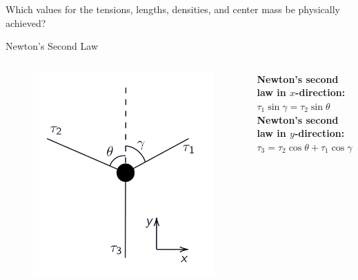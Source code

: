 \documentclass{beamer}
\begin{document}
\begin{frame}
    \centering
    \Huge Which values for the tensions, lengths, densities, and center mass be physically achieved?
\end{frame}
\begin{frame}{Newton's Second Law}
    \begin{columns}
        \begin{figure}
            \includegraphics[width=\textwidth]{theta_gamma.png}
        \end{figure}
 \textbf{Newton's second law in $x$-direction:} \\
        \medskip
        $\tau_1\sin\gamma = \tau_2\sin\theta$\\ 
        \bigskip
        \textbf{Newton's second law in $y$-direction:} \\
        \medskip
        $\tau_3 = \tau_2\cos \theta + \tau_1\cos\gamma$ \\
        \bigskip
    \end{columns}
\end{frame}
\end{document}

